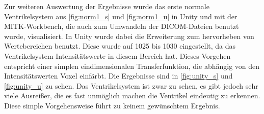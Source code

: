 Zur weiteren Auswertung der Ergebnisse wurde das erste normale Ventrikelsystem aus \autoref{fig:norm1_s} und \autoref{fig:norm1_u} in Unity und mit der MITK-Workbench, die auch zum Umwandeln der DICOM-Dateien benutzt wurde, visualisiert.
\newline
In Unity wurde dabei die Erweiterung zum hervorheben von Wertebereichen benutzt. Diese wurde auf 1025 bis 1030 eingestellt, da das Ventrikelsystem Intensitätswerte in diesem Bereich hat. Dieses Vorgehen entspricht einer simplen eindimensionalen Transferfunktion, die abhängig von den Intensitätswerten Voxel einfärbt.
Die Ergebnisse sind in \autoref{fig:unity_s} und \autoref{fig:unity_u} zu sehen. Das Ventrikelsystem ist zwar zu sehen, es gibt jedoch sehr viele Ausreißer, die es fast unmöglich machen die Ventrikel eindeutig zu erkennen. Diese simple Vorgehensweise führt zu keinem gewünschtem Ergebnis.



